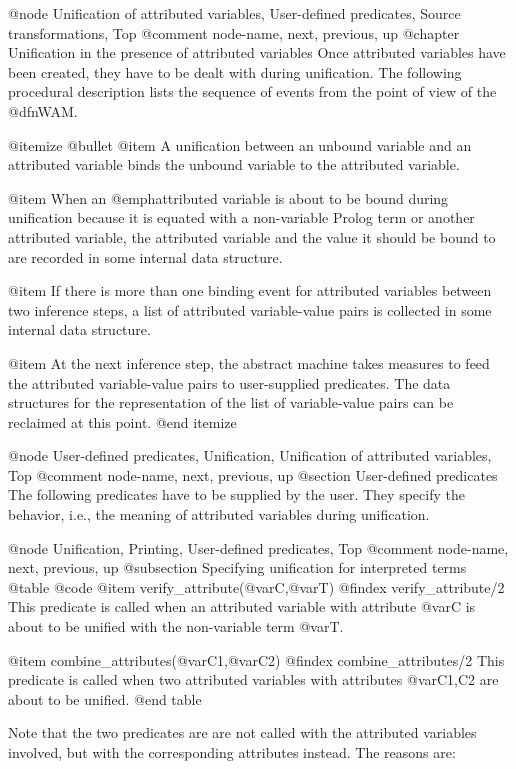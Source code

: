 @node Unification of attributed variables, User-defined predicates, Source transformations, Top   
@comment  node-name,  next,  previous,  up
@chapter Unification in the presence of attributed variables
Once attributed variables have been created, they have to be dealt with
during unification. The following procedural description lists the 
sequence of events from the point of view of the @dfn{WAM}. 

@itemize @bullet
@item
A unification between an unbound variable and an attributed variable
binds the unbound variable to the attributed variable.

@item 
When an @emph{attributed variable} is about to be bound during
unification because it is equated with a non-variable Prolog term or
another attributed variable, the attributed variable and the value it
should be bound to are recorded in some internal data structure.

@item 
If there is more than one binding event for attributed variables between
two inference steps, a list of attributed variable-value pairs is
collected in some internal data structure.

@item 
At the next inference step, the abstract machine takes measures to feed
the attributed variable-value pairs to user-supplied predicates. The
data structures for the representation of the list of variable-value
pairs can be reclaimed at this point.
@end itemize

@node User-defined predicates, Unification, Unification of attributed variables, Top    
@comment  node-name,  next,  previous,  up
@section User-defined predicates
The following predicates have to be supplied by the user. They
specify the behavior, i.e., the meaning of attributed variables during
unification.


@node Unification, Printing, User-defined predicates, Top   
@comment  node-name,  next,  previous,  up
@subsection Specifying unification for interpreted terms
@table @code
@item verify_attribute(@var{C},@var{T})
@findex verify_attribute/2
This predicate is called when an attributed
variable with attribute @var{C} is about to be unified with the
non-variable term @var{T}.

@item combine_attributes(@var{C1},@var{C2})
@findex combine_attributes/2
This predicate is called when two attributed variables with attributes
@var{C1,C2} are about to be unified.
@end table

Note that the two predicates are are not called with the attributed
variables involved, but with the corresponding attributes instead.  The
reasons are:

